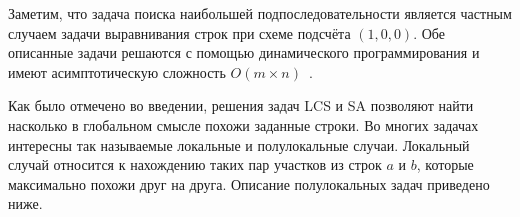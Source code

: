Заметим, что задача поиска наибольшей подпоследовательности является частным случаем задачи выравнивания строк при схеме подсчёта $(1,0,0)$.
Обе описанные задачи решаются с помощью динамического программирования и имеют асимптотическую сложность $O(m \times n)$~\cite{huang1994global}.

Как было отмечено во введении, решения задач LCS и SA позволяют найти насколько в глобальном смысле похожи заданные строки.
Во многих задачах интересны так называемые локальные и полулокальные случаи.
Локальный случай относится к нахождению таких пар участков из строк $a$ и $b$, которые максимально похожи друг на друга.
Описание полулокальных задач приведено ниже.



